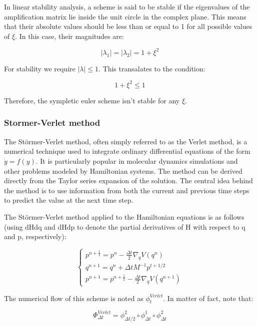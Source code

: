 \documentclass{article}
\begin{document}
In linear stability analysis, a scheme is said to be stable if the eigenvalues of the amplification matrix lie inside the unit circle in the complex plane. This means that their absolute values should be less than or equal to 1 for all possible values of \(\xi\). In this case, their magnitudes are:

\[
	|\lambda_1| = |\lambda_2| = 1 + \xi^2
\]

For stability we require \(|\lambda| \leq 1\). This transalates to the condition:

\[
	1 + \xi^2 \leq 1
\]

Therefore, the sympletic euler scheme isn't stable for any \(\xi\).




\subsubsection{Stormer-Verlet method}
\label{sec:stormer_verlet_method}

The Störmer-Verlet method, often simply referred to as the Verlet method, is a numerical technique used to integrate ordinary differential equations of the form \( \dot{y} = f(y) \). It is particularly popular in molecular dynamics simulations and other problems modeled by Hamiltonian systems. The method can be derived directly from the Taylor series expansion of the solution. The central idea behind the method is to use information from both the current and previous time steps to predict the value at the next time step. 

The Störmer-Verlet method applied to the Hamiltonian equations is as follows (using dHdq and dHdp to denote the partial derivatives of H with respect to q and p, respectively):

\begin{equation}
	\begin{cases}
		p^{n + \frac{1}{2}} = p^n - \frac{\Delta t}{2} \nabla_q V(q^n) \\
		q^{n+1} = q^{n} + \Delta t M^{-1} p^{t+1/2} \\
		p^{n+1} = p^{n+\frac{1}{2}} - \frac{\Delta t}{2} \nabla_q V(q^{n+1})
	\end{cases}
	\label{eq:stormerverlet}
\end{equation}

The numerical flow of this scheme is noted as \(\phi^{Verlet}_t\). In matter of fact, note that:

\[
	\Phi^{Verlet}_{\Delta t} = \phi^2_{\Delta t/2} \circ \phi^1_{\Delta t} \circ \phi^2_{\Delta t}
\]
\end{document}
